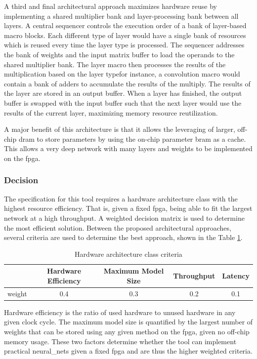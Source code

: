 \documentclass{uw-ece-wkrpt}
\begin{document}
A third and final architectural approach maximizes hardware reuse by implementing a shared multiplier bank and layer-processing bank between all layers. A central sequencer controls the execution order of a bank of layer-based macro blocks. Each different type of layer would have a single bank of resources which is reused every time the layer type is processed. The sequencer addresses the bank of weights and the input matrix buffer to load the operands to the shared multiplier bank. The layer macro then processes the results of the multiplication based on the layer type\textemdash{}for instance, a convolution macro would contain a bank of adders to accumulate the results of the multiply. The results of the layer are stored in an output buffer. When a layer has finished, the output buffer is swapped with the input buffer such that the next layer would use the results of the current layer, maximizing memory resource reutilization.

A major benefit of this architecture is that it allows the leveraging of larger, off-chip \gls{dram} to store parameters by using the on-chip parameter \gls{bram} as a cache. This allows a very deep network with many layers and weights to be implemented on the \gls{fpga}.

\subsubsection{Decision}

The specification for this tool requires a hardware architecture class with the highest resource efficiency. That is, given a fixed \gls{fpga}, being able to fit the largest network at a high throughput. A weighted decision matrix is used to determine the most efficient solution. Between the proposed architectural approaches, several criteria are used to determine the best approach, shown in the Table \ref{tab:hw_arch_criteria}.

\begin{table}
\centering
\caption{Hardware architecture class criteria}\label{tab:hw_arch_criteria}
\begin{tabular}{lcccc}
\toprule
       & Hardware Efficiency & Maximum Model Size & Throughput & Latency \\
\midrule
\Gls{weight} & 0.4 & 0.3 & 0.2 & 0.1 \\
\bottomrule
\end{tabular}
\end{table}

 Hardware efficiency is the ratio of used hardware to unused hardware in any given clock cycle. The maximum model size is quantified by the largest number of weights that can be stored using any given method on the \gls{fpga}, given no off-chip memory usage. These two factors determine whether the tool can implement practical \glspl{neural_net} given a fixed \gls{fpga} and are thus the higher weighted criteria.
\end{document}
